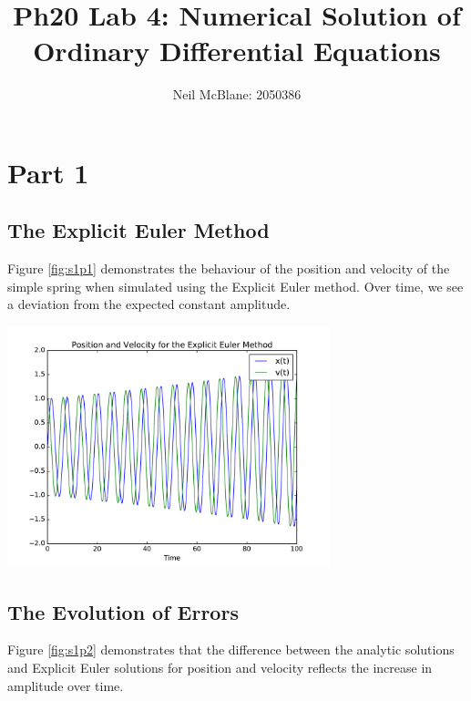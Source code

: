 \documentclass{article}
\newenvironment{Figure}
  {\par\medskip\noindent\minipage{\linewidth}}
  {\endminipage\par\medskip}
\begin{document}
\title{Ph20 Lab 4: Numerical Solution of Ordinary Differential Equations}
\author{Neil McBlane: 2050386}

\maketitle

\section{Part 1}
\subsection{The Explicit Euler Method}

Figure \ref{fig:s1p1} demonstrates the behaviour of the position and velocity of the simple spring when simulated using the Explicit Euler method. Over time, we see a deviation from the expected constant amplitude.

\begin{Figure}
\centering
\includegraphics[width=0.7\textwidth]{images/Sec1Plt1.pdf}
\label{fig:s1p1}
\end{Figure}

\subsection{The Evolution of Errors}

Figure \ref{fig:s1p2} demonstrates that the difference between the analytic solutions and Explicit Euler solutions for position and velocity reflects the increase in amplitude over time.
\end{document}
